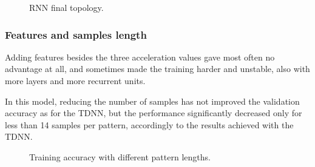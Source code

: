 \begin{center}
	\begin{figure}[ht!]
		\caption{RNN final topology.}
	\end{figure}
\end{center}

\subsubsection{Features and samples length}
Adding features besides the three acceleration values gave most often no advantage at all, and sometimes made the training harder and unstable, also with more layers and more recurrent units.

In this model, reducing the number of samples has not improved the validation accuracy as for the TDNN, but the performance significantly decreased only for less than 14 samples per pattern, accordingly to the results achieved with the TDNN.

\begin{center}
	\begin{figure}[ht!]
		\caption{Training accuracy with different pattern lengths.}
	\end{figure}
\end{center}

